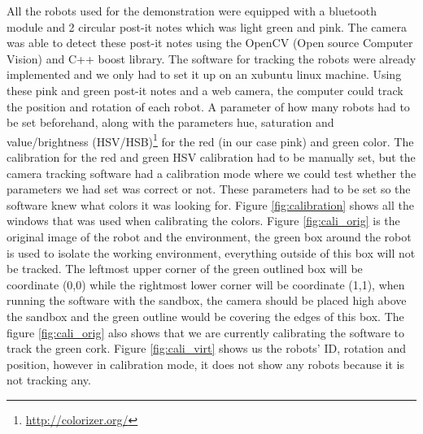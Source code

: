 All the robots used for the demonstration were equipped with a bluetooth module and 2 circular post-it notes which was light green and pink.
The camera was able to detect these post-it notes using the OpenCV (Open source Computer Vision) and C++ boost library. The software for tracking the robots were already implemented and we only had to set it up on an xubuntu linux machine.
Using these pink and green post-it notes and a web camera, the computer could track the position and rotation of each robot. A parameter of how many robots had to be set beforehand, along with the parameters hue, saturation and value/brightness (HSV/HSB)\footnote{\href{http://colorizer.org/}{http://colorizer.org/}} for the red (in our case pink) and green color. The calibration for the red and green HSV calibration had to be manually set, but the camera tracking software had a calibration mode where we could test whether the parameters we had set was correct or not. These parameters had to be set so the software knew what colors it was looking for.
Figure \ref{fig:calibration} shows all the windows that was used when calibrating the colors. Figure \ref{fig:cali_orig} is the original image of the robot and the environment, the green box around the robot is used to isolate the working environment, everything outside of this box will not be tracked. The leftmost upper corner of the green outlined box will be coordinate (0,0) while the rightmost lower corner will be coordinate (1,1), when running the software with the sandbox, the camera should be placed high above the sandbox and the green outline would be covering the edges of this box. The figure \ref{fig:cali_orig} also shows that we are currently calibrating the software to track the green cork. Figure \ref{fig:cali_virt} shows us the robots' ID, rotation and position, however in calibration mode, it does not show any robots because it is not tracking any.

